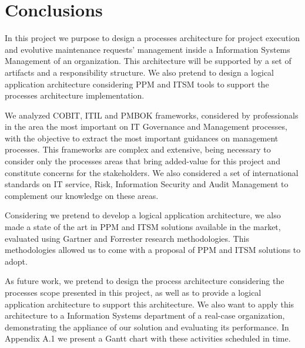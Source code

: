 
% 
% 

\section{Conclusions}

In this project we purpose to design a processes architecture for project execution and evolutive maintenance requests' management inside a Information Systems Management of an organization. This architecture will be supported by a set of artifacts and a responsibility structure. We also pretend to design a logical application architecture considering PPM and ITSM tools to support the processes architecture implementation.\par
We analyzed COBIT, ITIL and PMBOK frameworks, considered by professionals in the area the most important on IT Governance and Management processes, with the objective to extract the most important guidances on management processes. This frameworks are complex and extensive, being necessary to consider only the processes areas that bring added-value for this project and constitute concerns for the stakeholders. We also considered a set of international standards on IT service, Risk, Information Security and Audit Management to complement our knowledge on these areas.\par
Considering we pretend to develop a logical application architecture, we also made a state of the art in PPM and ITSM solutions available in the market, evaluated using Gartner and Forrester research methodologies. This methodologies allowed us to come with a proposal of PPM and ITSM solutions to adopt.\par
As future work, we pretend to design the process architecture considering the processes scope presented in this project, as well as to provide a logical application architecture to support this architecture. We also want to apply this architecture to a Information Systems department of a real-case organization, demonstrating the appliance of our solution and evaluating its performance. In Appendix A.1 we present a Gantt chart with these activities scheduled in time.\par 
